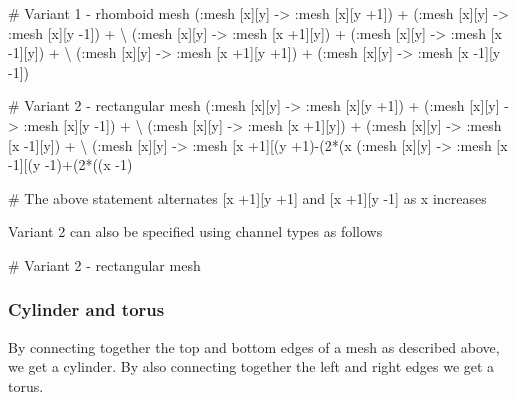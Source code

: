 \begin{kappasource}

# Variant 1 - rhomboid mesh
    (:mesh [x][y] -> :mesh [x][y +1]) + (:mesh [x][y] -> :mesh [x][y -1]) + {\textbackslash}
    (:mesh [x][y] -> :mesh [x +1][y]) + (:mesh [x][y] -> :mesh [x -1][y]) + {\textbackslash}
    (:mesh [x][y] -> :mesh [x +1][y +1]) + (:mesh [x][y] -> :mesh [x -1][y -1])

# Variant 2 - rectangular mesh
    (:mesh [x][y] -> :mesh [x][y +1]) + (:mesh [x][y] -> :mesh [x][y -1]) + {\textbackslash}
    (:mesh [x][y] -> :mesh [x +1][y]) + (:mesh [x][y] -> :mesh [x -1][y]) + {\textbackslash}
    (:mesh [x][y] -> :mesh [x +1][(y +1)-(2*(x%
    (:mesh [x][y] -> :mesh [x -1][(y -1)+(2*((x -1)%

# The above statement alternates [x +1][y +1] and [x +1][y -1] as x increases
\end{kappasource}

Variant 2 can also be specified using channel types as follows

\begin{kappasource}

# Variant 2 - rectangular mesh
\end{kappasource}


\subsubsection{Cylinder and torus}

By connecting together the top and bottom edges of a mesh as described above, we get a cylinder. By also connecting together the left and right edges we get a torus.

